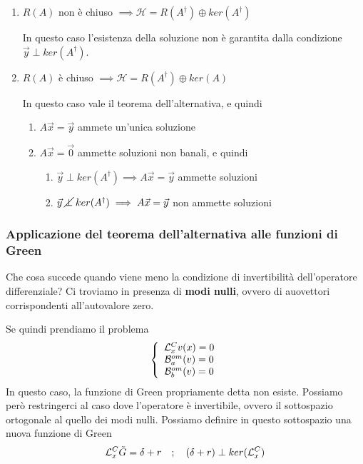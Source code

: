 \begin{enumerate}
	\item $R(A)$ non è chiuso $\implies \mathcal{H} = R(A^\dagger) \oplus ker(A^\dagger)$
	
	In questo caso l'esistenza della soluzione non è garantita dalla condizione $\vec{y} \perp ker(A^\dagger)$.
	
	\item $R(A)$ è chiuso $\implies \mathcal{H} = R(A^\dagger) \oplus ker(A)$
	
	In questo caso vale il teorema dell'alternativa, e quindi
	\begin{enumerate}
		\item $A \vec{x} = \vec{y}$ ammete un'unica soluzione
		
		\item $A \vec{x} = \vec{0}$ ammette soluzioni non banali, e quindi		
		\begin{enumerate}
			\item $\vec{y} \perp ker(A^\dagger) \implies A \vec{x} = \vec{y}$ ammette soluzioni
			\item $\vec{y} \; \cancel{\perp} \; ker(A^\dagger) \implies A \vec{x} = \vec{y}$ non ammette soluzioni
		\end{enumerate}
	\end{enumerate}
\end{enumerate}


\subsubsection{Applicazione del teorema dell'alternativa alle funzioni di Green}

Che cosa succede quando viene meno la condizione di invertibilità dell'operatore differenziale? Ci troviamo in presenza di \textbf{modi nulli}, ovvero di auovettori corrispondenti all'autovalore zero. 

Se quindi prendiamo il problema
\begin{align}
	\left\{ \begin{array}{ccc} \mathcal{L}_x^C v(x)=0\\ \mathcal{B}_a^{om}(v) = 0\\ \mathcal{B}_b^{om}(v) = 0 \end{array} \right.
\end{align}
In questo caso, la funzione di Green propriamente detta non esiste. Possiamo però restringerci al caso dove l'operatore è invertibile, ovvero il sottospazio ortogonale al quello dei modi nulli. 
Possiamo definire in questo sottospazio una nuova funzione di Green
\begin{align}
	\mathcal{L}_x^C \tilde{G} = \delta + r \quad ; \quad (\delta + r) \perp ker(\mathcal{L}_x^C) 
\end{align}

